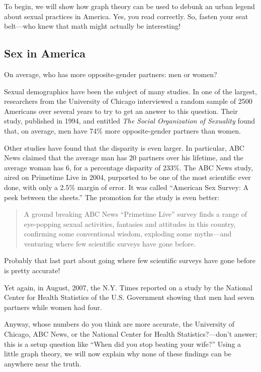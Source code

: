 To begin, we will show how graph theory can be used to debunk an urban
legend about sexual practices in America.  Yes, you read correctly.  So,
fasten your seat belt---who knew that math might actually be interesting!

\subsection{Sex in America}

On average, who has more opposite-gender partners: men or women?

Sexual demographics have been the subject of many studies.  In one of the
largest, researchers from the University of Chicago interviewed a random
sample of 2500 Americans over several years to try to get an answer to this
question.  Their study, published in 1994, and entitled \emph{The Social
  Organization of Sexuality} found that, on average, men have 74\% more
opposite-gender partners than women.

Other studies have found that the disparity is even larger.  In
particular, ABC News claimed that the average man has 20 partners over his
lifetime, and the average woman has 6, for a percentage disparity of
233\%.  The ABC News study, aired on Primetime Live in 2004, purported to
be one of the most scientific ever done, with only a 2.5\% margin of
error.  It was called ``American Sex Survey: A peek between the sheets.''
The promotion for the study is even better:
\begin{quote}
A ground breaking ABC News ``Primetime Live'' survey finds a range of
eye-popping sexual activities, fantasies and attitudes in this country,
confirming some conventional wisdom, exploding some myths---and venturing
where few scientific surveys have gone before.
\end{quote}
Probably that last part about going where few scientific surveys have gone
before is pretty accurate!

Yet again, in August, 2007, the N.Y. Times reported
on a study by the National Center for Health Statistics of the
U.S. Government showing that men had seven partners while women had
four.

Anyway, whose numbers do you think are more accurate, the University
of Chicago, ABC News, or the National Center for Health
Statistics?---don't answer; this is a setup question like ``When did
you stop beating your wife?''  Using a little graph theory, we will
now explain why none of these findings can be anywhere near the truth.

